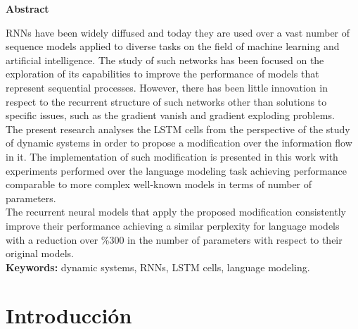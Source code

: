 \documentclass{article}
\begin{document}
	
	\vspace*{\fill}
	\pagebreak
	\vspace*{\fill}
	\begin{center}
		\Large\textbf{Abstract}\\
	\end{center}	
	\normalsize
	RNNs have been widely diffused and today they are used over a vast number of sequence models applied to diverse tasks on the field of machine learning and artificial intelligence. The study of such networks has been focused on the exploration of its capabilities to improve the performance of models that represent sequential processes. However, there has been little innovation in respect to the recurrent structure of such networks other than solutions to specific issues, such as the gradient vanish and gradient exploding problems. \\
	The present research analyses the LSTM cells from the perspective of the study of dynamic systems in order to propose a modification over the information flow in it. The implementation of such modification is presented in this work with experiments performed over the language modeling task achieving performance comparable to more complex well-known models in terms of number of parameters.\\
	The recurrent neural models that apply the proposed modification consistently improve their performance achieving a similar perplexity for language models with a reduction over \%300 in the number of parameters with respect to their original models.\\
	\textbf{Keywords:} dynamic systems, RNNs, LSTM cells, language modeling.\\
	
	\vspace*{\fill}
	\pagebreak
	
	
	\tableofcontents
	
	\pagebreak
	\section{Introducción}\label{sectionIntroduction}
	
\end{document}

